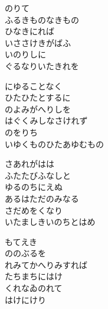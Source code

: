 \documentclass[10pt,b5j]{tarticle} %
\begin{document}
\vspace{1.5em} %
\newcommand{\linespace}{0.5em} %
\newcommand{\blocksize}{0.5\hsize} %
\begin{enumerate} %
    \begin{minipage}[c]{\blocksize}
    
        \vspace{\linespace}
        \item
        のりて\\
        ふるきものなきもの\\
        ひなきにれば\\
        いささけきがばふ\\
        いのりしに\\
        ぐるなりいたきれを
        
        \vspace{\linespace}
        \item
        にゆることなく\\
        ひたひたとするに\\
        のよみがへりしを\\
        はぐくみしなさけれず\\
        のをりち\\
        いゆくものひたあゆむもの
        
        \vspace{\linespace}
        \item
        さあれがはは\\
        ふたたびふなしと\\
        ゆるのちにえぬ\\
        あるはただのみなる\\
        さだめをくなり\\
        いたましきいのちとはめ
        
        \vspace{\linespace}
        \item
        もてえき\\
        ののぶるを\\
        れみてかへりみすれば\\
        たちまちにはけ\\
        くれなゐのれて\\
        はけにけり
        

\end{minipage}
\end{enumerate}
\end{document}
